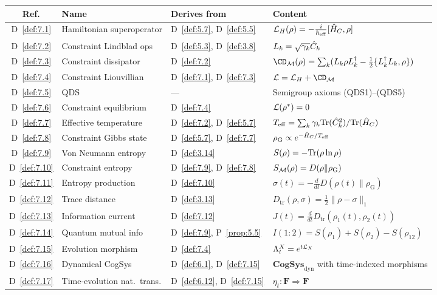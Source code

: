 \begin{center}
\begin{tabular}{cllp{5.0cm}}
\hline
\textbf{Ref.} & \textbf{Name} & \textbf{Derives from} &
  \textbf{Content} \\
\hline
D~\ref{def:7.1} & Hamiltonian superoperator &
  D~\ref{def:5.7}, D~\ref{def:5.5} &
  $\mathcal{L}_H(\rho) = -\frac{i}{\hbar_{\mathrm{eff}}}[\hat{H}_C, \rho]$ \\
D~\ref{def:7.2} & Constraint Lindblad ops &
  D~\ref{def:5.3}, D~\ref{def:3.8} &
  $L_k = \sqrt{\gamma_k}\hat{C}_k$ \\
D~\ref{def:7.3} & Constraint dissipator &
  D~\ref{def:7.2} &
  $\CD_\CM(\rho) = \sum_k(L_k\rho L_k^\dagger - \frac{1}{2}\{L_k^\dagger L_k, \rho\})$ \\
D~\ref{def:7.4} & Constraint Liouvillian &
  D~\ref{def:7.1}, D~\ref{def:7.3} &
  $\CL = \CL_H + \CD_\CM$ \\
D~\ref{def:7.5} & QDS &
  --- &
  Semigroup axioms (QDS1)--(QDS5) \\
D~\ref{def:7.6} & Constraint equilibrium &
  D~\ref{def:7.4} &
  $\mathcal{L}(\rho^*) = 0$ \\
D~\ref{def:7.7} & Effective temperature &
  D~\ref{def:7.2}, D~\ref{def:5.7} &
  $T_{\mathrm{eff}} = \sum_k \gamma_k \mathrm{Tr}(\hat{C}_k^2)/\mathrm{Tr}(\hat{H}_C)$ \\
D~\ref{def:7.8} & Constraint Gibbs state &
  D~\ref{def:5.7}, D~\ref{def:7.7} &
  $\rho_{\mathrm{G}} \propto e^{-\hat{H}_C/T_{\mathrm{eff}}}$ \\
D~\ref{def:7.9} & Von Neumann entropy &
  D~\ref{def:3.14} &
  $S(\rho) = -\mathrm{Tr}(\rho\ln\rho)$ \\
D~\ref{def:7.10} & Constraint entropy &
  D~\ref{def:7.9}, D~\ref{def:7.8} &
  $S_{\mathcal{M}}(\rho) = D(\rho\|\rho_{\mathrm{G}})$ \\
D~\ref{def:7.11} & Entropy production &
  D~\ref{def:7.10} &
  $\sigma(t) = -\frac{d}{dt}D(\rho(t)\|\rho_{\mathrm{G}})$ \\
D~\ref{def:7.12} & Trace distance &
  D~\ref{def:3.13} &
  $D_{\mathrm{tr}}(\rho, \sigma) = \frac{1}{2}\|\rho - \sigma\|_1$ \\
D~\ref{def:7.13} & Information current &
  D~\ref{def:7.12} &
  $J(t) = \frac{d}{dt}D_{\mathrm{tr}}(\rho_1(t), \rho_2(t))$ \\
D~\ref{def:7.14} & Quantum mutual info &
  D~\ref{def:7.9}, P~\ref{prop:5.5} &
  $I(1:2) = S(\rho_1) + S(\rho_2) - S(\rho_{12})$ \\
D~\ref{def:7.15} & Evolution morphism &
  D~\ref{def:7.4} &
  $\Lambda_t^X = e^{t\mathcal{L}_X}$ \\
D~\ref{def:7.16} & Dynamical CogSys &
  D~\ref{def:6.1}, D~\ref{def:7.15} &
  $\mathbf{CogSys}_{\mathrm{dyn}}$ with time-indexed morphisms \\
D~\ref{def:7.17} & Time-evolution nat.\ trans. &
  D~\ref{def:6.12}, D~\ref{def:7.15} &
  $\eta_t : \mathbf{F} \Rightarrow \mathbf{F}$ \\
\hline
\end{tabular}
\end{center}

